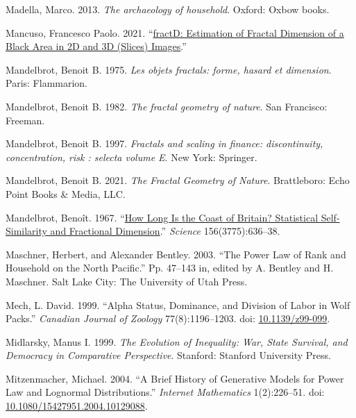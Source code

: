 \documentclass[
  12pt,
]{book}
\newlength{\cslhangindent}
\newlength{\cslentryspacingunit} %
\newenvironment{CSLReferences}[2] %
 {%
  \setlength{\parindent}{0pt}
  \ifodd #1
  \let\oldpar\par
  \def\par{\hangindent=\cslhangindent\oldpar}
  \fi
  \setlength{\parskip}{#2\cslentryspacingunit}
 }%
 {}
\begin{document}
\begin{CSLReferences}{1}{0}
\leavevmode{}%
Madella, Marco. 2013. \emph{The archaeology of household}. Oxford: Oxbow books.

\leavevmode{}%
Mancuso, Francesco Paolo. 2021. {``\href{https://CRAN.R-project.org/package=fractD}{fractD: Estimation of Fractal Dimension of a Black Area in 2D and 3D (Slices) Images}.''}

\leavevmode{}%
Mandelbrot, Benoit B. 1975. \emph{Les objets fractals: forme, hasard et dimension}. Paris: Flammarion.

\leavevmode{}%
Mandelbrot, Benoit B. 1982. \emph{The fractal geometry of nature}. San Francisco: Freeman.

\leavevmode{}%
Mandelbrot, Benoit B. 1997. \emph{Fractals and scaling in finance: discontinuity, concentration, risk : selecta volume E}. New York: Springer.

\leavevmode{}%
Mandelbrot, Benoit B. 2021. \emph{The Fractal Geometry of Nature}. Brattleboro: Echo Point Books \& Media, LLC.

\leavevmode{}%
Mandelbrot, Benoît. 1967. {``\href{https://www.jstor.org/stable/1721427}{How Long Is the Coast of Britain? Statistical Self-Similarity and Fractional Dimension}.''} \emph{Science} 156(3775):636--38.

\leavevmode{}%
Maschner, Herbert, and Alexander Bentley. 2003. {``The Power Law of Rank and Household on the North Pacific.''} Pp. 47--143 in, edited by A. Bentley and H. Maschner. Salt Lake City: The University of Utah Press.

\leavevmode{}%
Mech, L. David. 1999. {``Alpha Status, Dominance, and Division of Labor in Wolf Packs.''} \emph{Canadian Journal of Zoology} 77(8):1196--1203. doi: \href{https://doi.org/10.1139/z99-099}{10.1139/z99-099}.

\leavevmode{}%
Midlarsky, Manus I. 1999. \emph{The Evolution of Inequality: War, State Survival, and Democracy in Comparative Perspective}. Stanford: Stanford University Press.

\leavevmode{}%
Mitzenmacher, Michael. 2004. {``A Brief History of Generative Models for Power Law and Lognormal Distributions.''} \emph{Internet Mathematics} 1(2):226--51. doi: \href{https://doi.org/10.1080/15427951.2004.10129088}{10.1080/15427951.2004.10129088}.


\end{CSLReferences}
\end{document}
